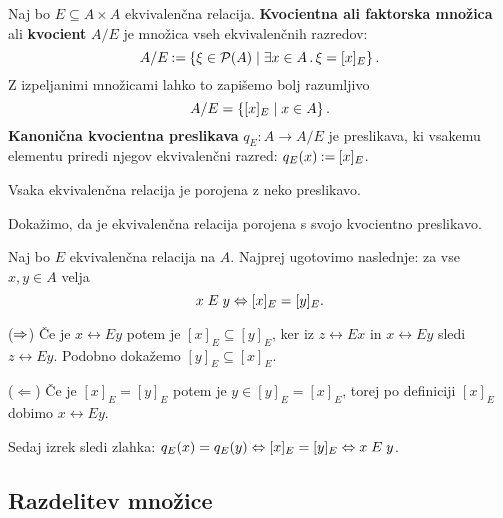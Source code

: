 \begin{definicija}
  Naj bo $E \subseteq A \times A$ ekvivalenčna relacija. \textbf{Kvocientna ali faktorska množica} ali \textbf{kvocient} $A/E$ je množica vseh ekvivalenčnih razredov:
  \begin{equation*}
    A/E \mathbin{{:}{=}} \left\{ \xi \in \mathcal{P}(A) \; \middle| \; \exists x \in A \,.\, \xi = [x]_E \right\}.
  \end{equation*}
  Z izpeljanimi množicami lahko to zapišemo bolj razumljivo
  \begin{equation*}
    A/E = \left\{ [x]_E \; \middle| \; x \in A \right\}.
  \end{equation*}
  \textbf{Kanonična kvocientna preslikava} $q_E : A \to A/E$ je preslikava, ki vsakemu elementu
  priredi njegov ekvivalenčni razred: $q_E(x) \mathbin{{:}{=}} [x]_E$.
\end{definicija}

\begin{izrek}
  Vsaka ekvivalenčna relacija je porojena z neko preslikavo.
\end{izrek}

\begin{dokaz}
  Dokažimo, da je ekvivalenčna relacija porojena s svojo kvocientno preslikavo.

  Naj bo $E$ ekvivalenčna relacija na $A$. Najprej ugotovimo naslednje: za vse $x,
  y \in A$ velja
  \begin{equation*}
    x \mathrel{E} y \Leftrightarrow [x]_E = [y]_E.
  \end{equation*}

  ($\Rightarrow$) Če je $x \rel{E} y$ potem je $[x]_E \subseteq [y]_E$, ker iz $z \rel{E} x$ in $x \rel{E} y$ sledi $z \rel{E} y$.
  Podobno dokažemo $[y]_E \subseteq [x]_E$.

  ($\Leftarrow$) Če je $[x]_E = [y]_E$ potem je $y \in [y]_E = [x]_E$, torej po definiciji $[x]_E$
  dobimo $x \rel{E} y$.

  Sedaj izrek sledi zlahka: $q_E(x) = q_E(y) \Leftrightarrow [x]_E = [y]_E \Leftrightarrow x \mathrel{E} y$.
\end{dokaz}


\subsection{Razdelitev množice}

